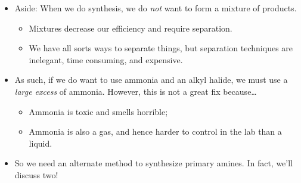 \documentclass[../notes.tex]{subfiles}
\begin{document}
\begin{itemize}
\begin{itemize}
        \item Would this work? Sort of.
        \begin{itemize}
            \item When we carry out this reaction, we obtain a primary ammonium cation that is easily (and reversibly) deprotonated to ethylamine by other basic ammonia molecules floating around.
            \item This frees up the ethylamine product to react again! In fact, even though ethylamine is sterically more hindered, it is electronically more activated.
            \item It follows that the ethylamine we've created will react \emph{even faster} than ammonia, forming a secondary ammonium cation.
        \end{itemize}
        \item After a few more successive cycles of S\textsubscript{N}2's and deprotonations --- creating iteratively more substituted and hence more electronically activated amines --- we obtain a quaternary ammonium salt\footnote{Note that at the board, Prof. Buchwald uses parentheses and numerical subscripts to indicate groups that are repeated multiple times.} as our major product.
        \item Therefore, the major product is tetraethylammonium, a quaternary ammonium salt.
    \end{itemize}
    \item Aside: When we do synthesis, we do \emph{not} want to form a mixture of products.
    \begin{itemize}
        \item Mixtures decrease our efficiency and require separation.
        \item We have all sorts ways to separate things, but separation techniques are inelegant, time consuming, and expensive.
    \end{itemize}
    \item As such, if we do want to use ammonia and an alkyl halide, we must use a \emph{large excess} of ammonia. However, this is not a great fix because\dots
    \begin{itemize}
        \item Ammonia is toxic and smells horrible;
        \item Ammonia is also a gas, and hence harder to control in the lab than a liquid.
    \end{itemize}
    \item So we need an alternate method to synthesize primary amines. In fact, we'll discuss two!

\end{itemize}
\end{document}
